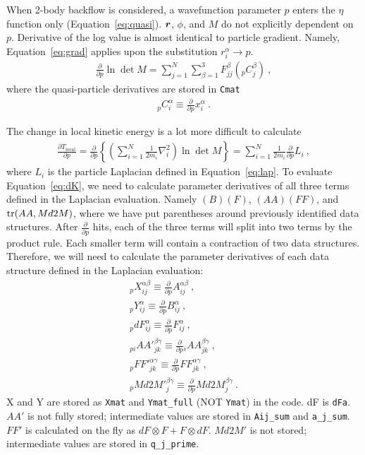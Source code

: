 When 2-body backflow is considered, a wavefunction parameter $p$ enters the $\eta$ function only (Equation~\ref{eq:quasi}). $\boldsymbol{r}$, $\phi$, and $M$ do not explicitly dependent on $p$. Derivative of the log value is almost identical to particle gradient. Namely, Equation~\ref{eq:grad} applies upon the substitution $r_i^\alpha\rightarrow p$.
\begin{align}
\frac{\partial}{\partial p} \ln\det M = \sum\limits_{j=1}^N \sum\limits_{\beta=1}^3 F_{jj}^\beta \left({}_pC_{j}^{\beta}\right)\:,
\end{align}
where the quasi-particle derivatives are stored in \verb|Cmat|
\begin{align}
{}_pC_{i}^{\alpha} \equiv \frac{\partial}{\partial p} x_{i}^{\alpha}\:.
\end{align}

The change in local kinetic energy is a lot more difficult to calculate
\begin{align}
\frac{\partial T_{\text{local}}}{\partial p} = \frac{\partial}{\partial p} \left\{ \left( \sum\limits_{i=1}^N \frac{1}{2m_i} \nabla^2_i \right) \ln \det M \right\} = \sum\limits_{i=1}^N \frac{1}{2m_i} \frac{\partial}{\partial p} L_i\:, \label{eq:dK}
\end{align}
where $L_i$ is the particle Laplacian defined in Equation~\ref{eq:lap}. To evaluate Equation~\ref{eq:dK}, we need to calculate parameter derivatives of all three terms defined in the Laplacian evaluation. Namely $(B)(F)$, $(AA)(FF)$, and $\text{tr}(AA,Md2M)$, where we have put parentheses around previously identified data structures. After $\frac{\partial}{\partial p}$ hits, each of the three terms will split into two terms by the product rule. Each smaller term will contain a contraction of two data structures. Therefore, we will need to calculate the parameter derivatives of each data structure defined in the Laplacian evaluation:
\begin{align}
{}_pX_{ij}^{\alpha\beta} \equiv \frac{\partial}{\partial p} A_{ij}^{\alpha\beta}\:, \\
{}_pY_{ij}^{\alpha} \equiv \frac{\partial}{\partial p} B_{ij}^{\alpha}\:, \\
{}_pdF_{ij}^{\alpha} \equiv \frac{\partial}{\partial p} F_{ij}^{\alpha}\:, \\
{}_{pi}{AA'}_{jk}^{\beta\gamma} \equiv \frac{\partial}{\partial p}  {}_iAA_{jk}^{\beta\gamma}\:, \\
{}_p {FF'}_{jk}^{\alpha\gamma} \equiv \frac{\partial}{\partial p} FF_{jk}^{\alpha\gamma}\:, \\
{}_p {Md2M'}_{j}^{\beta\gamma} \equiv \frac{\partial}{\partial p} Md2M_j^{\beta\gamma}\:.
\end{align}
X and Y are stored as \verb|Xmat| and \verb|Ymat_full| (NOT \verb|Ymat|) in the code. dF is \verb|dFa|. $AA'$ is not fully stored; intermediate values are stored in \verb|Aij_sum| and \verb|a_j_sum|. $FF'$ is calculated on the fly as $dF\otimes F+F\otimes dF$. $Md2M'$ is not stored; intermediate values are stored in \verb|q_j_prime|.
